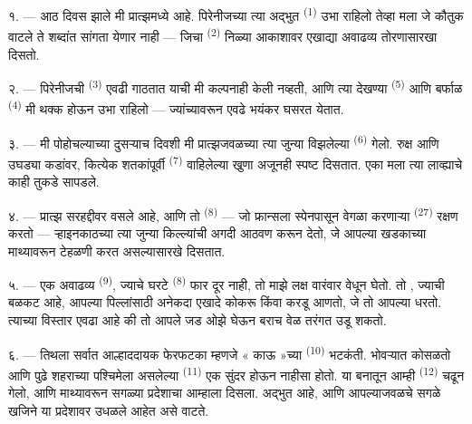 \VUsaut{4.0mm}
\VUsaut{3.0mm}

\VUsaut{3.0mm}

\VUsaut{3.0mm}

१. --- आठ दिवस झाले मी प्रात्झमध्ये आहे. पिरेनीजच्या त्या अद्भुत 
\textsuperscript{(1)} उभा राहिलो तेव्हा मला जे कौतुक वाटले ते शब्दांत सांगता येणार नाही — जिचा
 \textsuperscript{(2)} निळ्या आकाशावर एखाद्या अवाढव्य तोरणासारखा दिसतो.

२. --- पिरेनीजची  \textsuperscript{(3)} एवढी  गाठतात याची मी
कल्पनाही केली नव्हती, आणि त्या देखण्या  \textsuperscript{(5)} आणि बर्फाळ
 \textsuperscript{(4)} मी थक्क होऊन उभा राहिलो — ज्यांच्यावरून एवढे
भयंकर  घसरत येतात.

\VUsaut{3.0mm}
\VUsaut{3.0mm}

३. --- मी पोहोचल्याच्या दुसऱ्याच दिवशी मी प्रात्झजवळच्या त्या जुन्या विझलेल्या
 \textsuperscript{(6)} गेलो.  रुक्ष आणि उघड्या कडांवर,
कित्येक शतकांपूर्वी  \textsuperscript{(7)} वाहिलेल्या
 खुणा अजूनही स्पष्ट दिसतात. एका  मला त्या लाव्ह्याचे काही
तुकडे सापडले.

४. --- प्रात्झ सरहद्दीवर वसले आहे, आणि तो  \textsuperscript{(8)} — जो फ्रान्सला
स्पेनपासून वेगळा करणाऱ्या  \textsuperscript{(27)} रक्षण करतो — ऱ्हाइनकाठच्या
त्या जुन्या किल्ल्यांची अगदी आठवण करून देतो, जे आपल्या खडकाच्या माथ्यावरून 
टेहळणी करत असल्यासारखे दिसतात.

५. --- एक अवाढव्य  \textsuperscript{(9)}, ज्याचे घरटे 
\textsuperscript{(8)} फार दूर नाही, तो माझे लक्ष वारंवार वेधून घेतो. तो ,
ज्याची  बळकट आहे, आपल्या पिल्लांसाठी अनेकदा एखादे कोकरू किंवा करडू आणतो, जे तो
आपल्या  धरतो. त्याच्या  विस्तार एवढा आहे की तो आपले जड ओझे घेऊन
बराच वेळ तरंगत उडू शकतो.


\VUsaut{3.0mm}
\VUsaut{3.0mm}

६. --- तिथला सर्वात आल्हाददायक फेरफटका म्हणजे « काऊ »च्या 
\textsuperscript{(10)} भटकंती.  भोवऱ्यात कोसळतो आणि पुढे शहराच्या पश्चिमेला
असलेल्या  \textsuperscript{(11)} एक सुंदर  होऊन नाहीसा होतो.
या बनातून आम्ही  \textsuperscript{(12)} चढून गेलो, आणि
 माथ्यावरून सगळ्या प्रदेशाचा  आम्हाला दिसला.
 अद्भुत आहे, आणि  आपल्याजवळचे सगळे खजिने या प्रदेशावर
उधळले आहेत असे वाटते.

